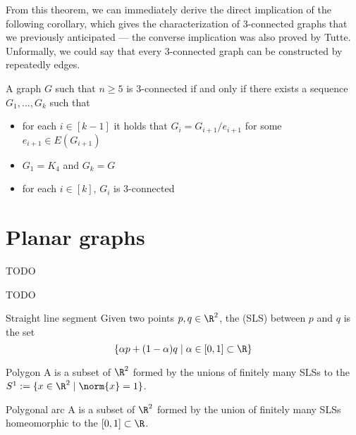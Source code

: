 \documentclass[a4paper, 12pt]{report}
\begin{document}
    From this theorem, we can immediately derive the direct implication of the following corollary, which gives the characterization of 3-connected graphs that we previously anticipated --- the converse implication was also proved by Tutte. Unformally, we could say that every 3-connected graph can be constructed by repeatedly  edges.

    \begin{framedcor}{}
        A graph $G$ such that $n \ge 5$ is 3-connected if and only if there exists a sequence $G_1, \ldots, G_k$ such that

        \begin{itemize}
            \item for each $i \in [k - 1]$ it holds that $G_i = G_{i + 1}/e_{i + 1}$ for some $e_{i + 1} \in E(G_{i + 1})$
            \item $G_1 = K_4$ and $G_k = G$
            \item for each $i \in [k]$, $G_i$ is 3-connected
        \end{itemize}
    \end{framedcor}

    \chapter{Planar graphs}

    TODO 

    TODO 

    \begin{frameddefn}{Straight line segment}
        Given two points $p, q \in \R^2$, the  (SLS) between $p$ and $q$ is the set $$\{\alpha p + (1 - \alpha)q \mid \alpha \in [0, 1] \subset \R\}$$
    \end{frameddefn}

    \begin{frameddefn}{Polygon}
        A  is a subset of $\R^2$ formed by the unions of finitely many SLSs  to the  $S^1 := \{x \in \R^2 \mid \norm{x} = 1\}$.
    \end{frameddefn}

    \begin{frameddefn}{Polygonal arc}
        A  is a subset of $\R^2$ formed by the union of finitely many SLSs homeomorphic to the  $[0, 1] \subset \R$.
    \end{frameddefn}
\end{document}

